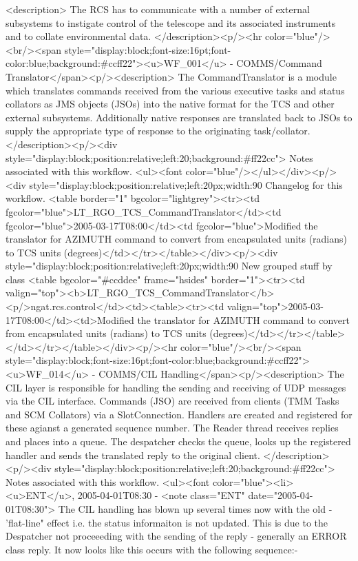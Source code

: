     <description>
      The RCS has to communicate with a number of external subsystems to instigate control of
      the telescope and its associated instruments and to collate environmental data. 
    </description><p/><hr color="blue"/><br/><span style="display:block;font-size:16pt;font-color:blue;background:#ccff22"><u>WF_001</u> -    COMMS/Command Translator</span><p/><description>
	The CommandTranslator is a module which translates commands received from the various
	executive tasks and status collators as JMS objects (JSOs) into the native format for
	the TCS and other external subsystems. Additionally native responses are translated
	back to JSOs to supply the appropriate type of response to the originating task/collator.             
      </description><p/><div style="display:block;position:relative;left:20;background:#ff22cc">
      Notes associated with this workflow.
      <ul><font color="blue"/></ul></div><p/><div style="display:block;position:relative;left:20px;width:90%
      Changelog for this workflow.
      <table border="1" bgcolor="lightgrey"><tr><td fgcolor="blue">LT_RGO_TCS_CommandTranslator</td><td fgcolor="blue">2005-03-17T08:00</td><td fgcolor="blue">Modified the translator for AZIMUTH command to convert from
	    encapsulated units (radians) to TCS units (degrees)</td></tr></table></div><p/><div style="display:block;position:relative;left:20px;width:90%
     New grouped stuff by class
     <table bgcolor="#ccddee" frame="hsides" border="1"><tr><td valign="top"><b>LT_RGO_TCS_CommandTranslator</b><p/>ngat.rcs.control</td><td><table><tr><td valign="top">2005-03-17T08:00</td><td>Modified the translator for AZIMUTH command to convert from
	    encapsulated units (radians) to TCS units (degrees)</td></tr></table></td></tr></table></div><p/><hr color="blue"/><br/><span style="display:block;font-size:16pt;font-color:blue;background:#ccff22"><u>WF_014</u> -    COMMS/CIL Handling</span><p/><description>
	The CIL layer is responsible for handling the sending and receiving of UDP messages via the
	CIL interface. Commands (JSO) are received from clients (TMM Tasks and SCM Collators) via a
	SlotConnection. Handlers are created and registered for these agianst a generated sequence number.
	The Reader thread receives replies and places into a queue. The despatcher checks the queue,
	looks up the registered handler and sends the translated reply to the original client.
      </description><p/><div style="display:block;position:relative;left:20;background:#ff22cc">
      Notes associated with this workflow.
      <ul><font color="blue"><li><u>ENT</u>, 2005-04-01T08:30 -  <note class="ENT" date="2005-04-01T08:30">
	The CIL handling has blown up several times now with the old - 'flat-line" effect i.e. the status
	informaiton is not updated. This is due to the Despatcher not proceeeding with the sending of the
	reply - generally an ERROR class reply. It now looks like this occurs with the following sequence:-


